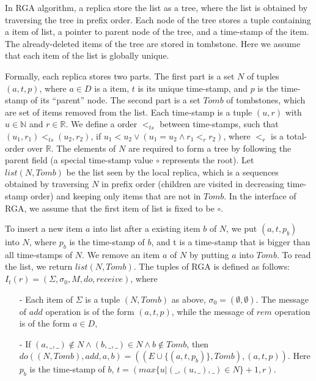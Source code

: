 \begin{example}[RGA]
\label{definition:rga implementation}
In RGA algorithm, a replica store the list as a tree, where the list is obtained by traversing the tree in prefix order. Each node of the tree stores a tuple containing a item of list, a pointer to parent node of the tree, and a time-stamp of the item. The already-deleted items of the tree are stored in tombstone. Here we assume that each item of the list is globally unique.

Formally, each replica stores two parts. The first part is a set $N$ of tuples $(a,t,p)$, where $a \in D$ is a item, $t$ is its unique time-stamp, and $p$ is the time-stamp of its ``parent'' node. The second part is a set $\mathit{Tomb}$ of tombstones, which are set of items removed from the list. Each time-stamp is a tuple $(u,r)$ with $u \in \mathbb{N}$ and $r \in \mathbb{R}$. We define a order $<_{\mathit{ts}}$ between time-stamps, such that $(u_1,r_1) <_{\mathit{ts}} (u_2,r_2)$, if $u_1 < u_2 \vee (u_1 = u_2 \wedge r_1 <_r r_2)$, where $<_r$ is a total-order over $\mathbb{R}$. The elements of $N$ are required to form a tree by following the parent field (a special time-stamp value $\circ$ represents the root). Let $\mathit{list}(N,\mathit{Tomb})$ be the list seen by the local replica, which is a sequences obtained by traversing $N$ in prefix order (children are visited in decreasing time-stamp order) and keeping only items that are not in $\mathit{Tomb}$. In the interface of RGA, we assume that the first item of list is fixed to be $\circ$.

To insert a new item $a$ into list after a existing item $b$ of $N$, we put $(a,t,p_b)$ into $N$, where $p_b$ is the time-stamp of $b$, and t is a time-stamp that is bigger than all time-stamps of $N$. We remove an item $a$ of $N$ by putting $a$ into $\mathit{Tomb}$. To read the list, we return $\mathit{list}(N,\mathit{Tomb})$. The tuples of RGA is defined as follows: $I_t(r) = (\Sigma, \sigma_0, M, \mathit{do},\mathit{receive})$, where

\begin{itemize}
\setlength{\itemsep}{0.5pt}
\item[-] Each item of $\Sigma$ is a tuple $(N,\mathit{Tomb})$ as above, $\sigma_0 = (\emptyset, \emptyset)$. The message of $\mathit{add}$ operation is of the form $(a,t,p)$, while the message of $\mathit{rem}$ operation is of the form $a \in D$,

\item[-] If $(a,\_,\_) \notin N \wedge (b,\_,\_) \in N \wedge b \notin \mathit{Tomb}$, then $\mathit{do}((N,\mathit{Tomb}),\mathit{add},a,b) = ((E \cup \{ (a,t,p_b) \},\mathit{Tomb}),(a,t,p))$. Here $p_b$ is the time-stamp of $b$, $t = (\mathit{max}\{ u \vert (\_,(u,\_),\_) \in N \}+1,r)$.


\end{itemize}
\end{example}
